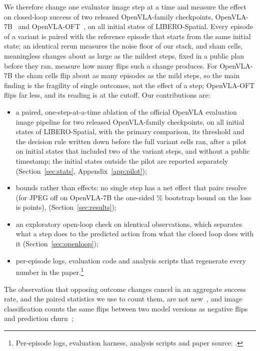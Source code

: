 We therefore change one evaluator image step at a time and measure the effect on closed-loop success of two released OpenVLA-family checkpoints, OpenVLA-7B~\citep{openvla} and OpenVLA-OFT~\citep{oft}, on all \NPairs{} initial states of LIBERO-Spatial. Every episode of a variant is paired with the reference episode that starts from the same initial state; an identical rerun measures the noise floor of our stack, and sham cells, meaningless changes about as large as the mildest steps, fixed in a public plan before they ran, measure how many flips such a change produces. For OpenVLA-7B the sham cells flip about as many episodes as the mild steps, so the main finding is the fragility of single outcomes, not the effect of a step; OpenVLA-OFT flips far less, and its reading is at the cutoff. Our contributions are:
\begin{itemize}
\item a paired, one-step-at-a-time ablation of the official OpenVLA evaluation image pipeline for two released OpenVLA-family checkpoints, on all \NPairs{} initial states of LIBERO-Spatial, with the primary comparison, its threshold and the decision rule written down before the full variant cells ran, after a pilot on initial states \SplitA{} that included two of the variant steps, and without a public timestamp; the \OutPairs{} initial states outside the pilot are reported separately (Section~\ref{sec:stats}, Appendix~\ref{app:pilot});
\item bounds rather than effects: no single step has a net effect that \NPairs{} pairs resolve (for JPEG off on OpenVLA-7B the one-sided \AlphaPct\% bootstrap bound on the loss is \SevJpegUB{} points), \HookContribFlips{} (Section~\ref{sec:results});
\item an exploratory open-loop check on identical observations, which separates what a step does to the predicted action from what the closed loop does with it (Section~\ref{sec:openloop});
\item per-episode logs, evaluation code and analysis scripts that regenerate every number in the paper.\footnote{Per-episode logs, evaluation harness, analysis scripts and paper source: \RepoURL.\HarnessNote}
\end{itemize}
The observation that opposing outcome changes cancel in an aggregate success rate, and the paired statistics we use to count them, are not new~\citep{liberoctrl,li2026paraphrase}, and image classification counts the same flips between two model versions as negative flips and prediction churn~\citep{yan2021pct,bhojanapalli2021churn}; \HookIntroNew
